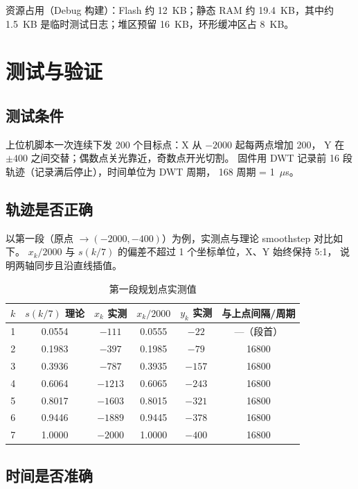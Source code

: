 \documentclass[UTF8,a4paper,11pt]{ctexart}
\begin{document}
资源占用（Debug 构建）：Flash 约 12~KB；静态 RAM 约 19.4~KB，其中约 1.5~KB
是临时测试日志；堆区预留 16~KB，环形缓冲区占 8~KB。

\section{测试与验证}

\subsection{测试条件}

上位机脚本一次连续下发 200 个目标点：X 从 $-2000$ 起每两点增加 200，
Y 在 $\pm400$ 之间交替；偶数点关光靠近，奇数点开光切割。
固件用 DWT 记录前 16 段轨迹（记录满后停止），时间单位为 DWT 周期，
168 周期 = 1~$\mu$s。

\subsection{轨迹是否正确}

以第一段（原点 $\to(-2000,-400)$）为例，实测点与理论 smoothstep 对比如下。
$x_k/2000$ 与 $s(k/7)$ 的偏差不超过 1 个坐标单位，X、Y 始终保持 5:1，
说明两轴同步且沿直线插值。

\begin{table}[htbp]
\centering
\caption{第一段规划点实测值}
\begin{tabular}{@{}cccccc@{}}
\toprule
$k$ & $s(k/7)$ 理论 & $x_k$ 实测 & $x_k/2000$ & $y_k$ 实测 & 与上点间隔/周期 \\
\midrule
1 & 0.0554 & $-111$  & 0.0555 & $-22$  & ---（段首） \\
2 & 0.1983 & $-397$  & 0.1985 & $-79$  & 16800 \\
3 & 0.3936 & $-787$  & 0.3935 & $-157$ & 16800 \\
4 & 0.6064 & $-1213$ & 0.6065 & $-243$ & 16800 \\
5 & 0.8017 & $-1603$ & 0.8015 & $-321$ & 16800 \\
6 & 0.9446 & $-1889$ & 0.9445 & $-378$ & 16800 \\
7 & 1.0000 & $-2000$ & 1.0000 & $-400$ & 16800 \\
\bottomrule
\end{tabular}
\end{table}

\subsection{时间是否准确}
\end{document}

